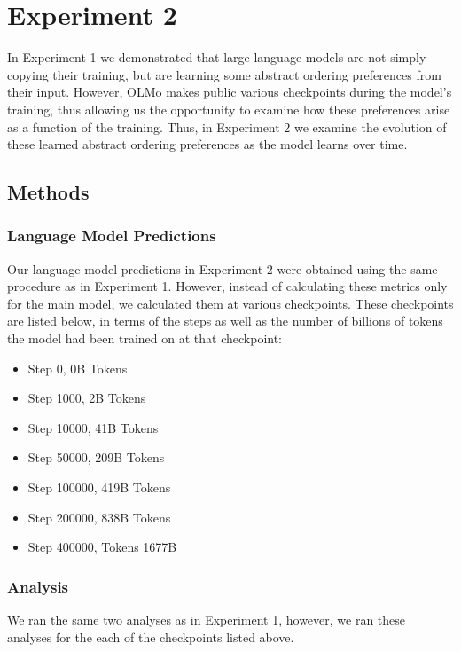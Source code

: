 \documentclass[
  nottoc]{article}
\begin{document}
\section{Experiment 2}\label{experiment-2}

In Experiment 1 we demonstrated that large language models are not
simply copying their training, but are learning some abstract ordering
preferences from their input. However, OLMo makes public various
checkpoints during the model's training, thus allowing us the
opportunity to examine how these preferences arise as a function of the
training. Thus, in Experiment 2 we examine the evolution of these
learned abstract ordering preferences as the model learns over time.

\subsection{Methods}\label{methods-1}

\subsubsection{Language Model
Predictions}\label{language-model-predictions-1}

Our language model predictions in Experiment 2 were obtained using the
same procedure as in Experiment 1. However, instead of calculating these
metrics only for the main model, we calculated them at various
checkpoints. These checkpoints are listed below, in terms of the steps
as well as the number of billions of tokens the model had been trained
on at that checkpoint:

\begin{itemize}
\item
  Step 0, 0B Tokens
\item
  Step 1000, 2B Tokens
\item
  Step 10000, 41B Tokens
\item
  Step 50000, 209B Tokens
\item
  Step 100000, 419B Tokens
\item
  Step 200000, 838B Tokens
\item
  Step 400000, Tokens 1677B
\end{itemize}

\subsubsection{Analysis}\label{analysis}

We ran the same two analyses as in Experiment 1, however, we ran these
analyses for the each of the checkpoints listed above.
\end{document}
